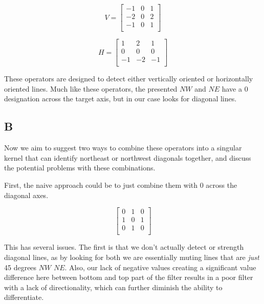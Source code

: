 \documentclass{article}
\begin{document}
\begin{equation}
    V = \begin{bmatrix}
        -1 & 0 & 1 \\
        -2 & 0 & 2 \\
        -1 & 0 & 1 \\
    \end{bmatrix}
\end{equation}

\begin{equation}
    H = \begin{bmatrix}
        1 & 2 & 1 \\
        0 & 0 & 0 \\
        -1 & -2 & -1 \\
    \end{bmatrix}
\end{equation}

These operators are designed to detect either vertically oriented or horizontally oriented lines. Much like these operators, the presented $NW$ and $NE$ have a 0 designation across the target axis, but in our case looks for diagonal lines.

\subsection*{B}

Now we aim to suggest two ways to combine these operators into a singular kernel that can identify northeast or northwest diagonals together, and discuss the potential problems with these combinations.

First, the naive approach could be to just combine them with $0$ across the diagonal axes.

\begin{equation}
    \begin{bmatrix}
        0 & 1 & 0 \\
        1 & 0 & 1 \\
        0 & 1 & 0 \\
    \end{bmatrix}
\end{equation}

This has several issues. The first is that we don't actually detect or strength diagonal lines, as by looking for both we are essentially muting lines that are \textit{just} 45 degrees $NW$ $NE$. Also, our lack of negative values creating a significant value difference here between bottom and top part of the filter results in a poor filter with a lack of directionality, which can further diminish the ability to differentiate.
\end{document}
